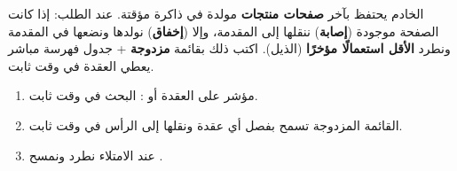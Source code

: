 \begin{statement}
الخادم يحتفظ بآخر \textbf{ صفحات منتجات} مولدة في ذاكرة مؤقتة. عند الطلب: إذا كانت الصفحة موجودة (\textbf{إصابة}) ننقلها إلى المقدمة، وإلا (\textbf{إخفاق}) نولدها ونضعها في المقدمة ونطرد \textbf{الأقل استعمالًا مؤخرًا} (الذيل). اكتب ذلك بقائمة \textbf{مزدوجة} + جدول فهرسة مباشر  يعطي العقدة في وقت ثابت.
\end{statement}
\begin{stepsbox}\begin{enumerate}
\item {} مؤشر على العقدة أو : البحث في وقت ثابت.
\item القائمة المزدوجة تسمح بفصل أي عقدة ونقلها إلى الرأس في وقت ثابت.
\item عند الامتلاء نطرد  ونمسح .
\end{enumerate}\end{stepsbox}
